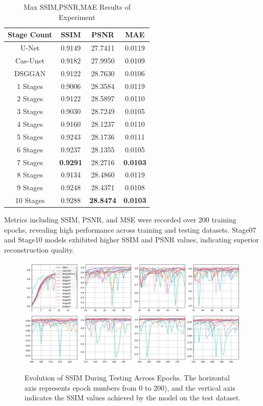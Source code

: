 \documentclass[a4paper, times, 10pt,twocolumn]{article}
\begin{document}
\begin{table}[h]
	\centering
	\caption{Max SSIM,PSNR,MAE Results of Experiment}
	\label{tab:exps_result}
	\begin{tabular}{cccc}
		\hline
		Stage Count & SSIM            & PSNR             & MAE             \\
		\hline
		U-Net       & 0.9149          & 27.7411          & 0.0119          \\
		Cas-Unet    & 0.9182          & 27.9950          & 0.0109          \\
		DSGGAN      & 0.9122          & 28.7630          & 0.0106          \\
		1 Stages    & 0.9006          & 28.3584          & 0.0119          \\
		2 Stages    & 0.9122          & 28.5897          & 0.0110          \\
		3 Stages    & 0.9030          & 28.7249          & 0.0105          \\
		4 Stages    & 0.9160          & 28.1237          & 0.0110          \\
		5 Stages    & 0.9243          & 28.1736          & 0.0111          \\
		6 Stages    & 0.9237          & 28.1355          & 0.0105          \\
		7 Stages    & \textbf{0.9291} & 28.2716          & \textbf{0.0103} \\
		8 Stages    & 0.9134          & 28.4860          & 0.0119          \\
		9 Stages    & 0.9248          & 28.4371          & 0.0108          \\
		10 Stages   & 0.9288          & \textbf{28.8474} & \textbf{0.0103} \\
		\hline
	\end{tabular}
\end{table}

Metrics including SSIM, PSNR, and MSE were recorded over 200 training epochs, revealing high performance across training and testing datasets. Stage07 and Stage10 models exhibited higher SSIM and PSNR values, indicating superior reconstruction quality.

\begin{figure}[h]
	\centering
	\includegraphics[width=1.0\linewidth]{u-net/lung/csvimg_lung_mnv3/ssim_comparison_8.png}
	\caption[ssim]{Evolution of SSIM During Testing Across Epochs. The horizontal axis represents epoch numbers from 0 to 200), and the vertical axis indicates the SSIM values achieved by the model on the test dataset.}
	\label{fig:ssim}
\end{figure}
\end{document}
